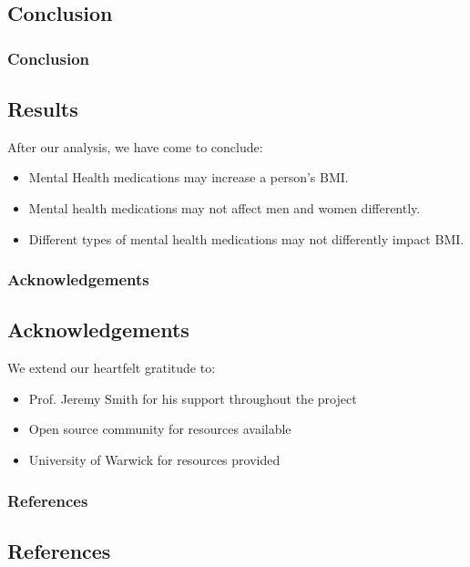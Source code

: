 \documentclass[
	11pt, %
]{beamer}
\begin{document}

\begin{frame} \section{Conclusion}
	\frametitle{Conclusion}\subsection{Results} %
 After our analysis, we have come to conclude:	
    \begin{itemize}
        \item Mental Health medications may increase a person's BMI.
        \item Mental health medications may not affect men and women differently.
        \item Different types of mental health medications may not differently impact BMI.
    \end{itemize}
\end{frame}


\begin{frame}
	\frametitle{Acknowledgements}\subsection{Acknowledgements} %
We extend our heartfelt gratitude to:
    \begin{itemize}
        \item Prof. Jeremy Smith for his support throughout the project
        \item Open source community for resources available
        \item University of Warwick for resources provided
    \end{itemize}

\end{frame}


\begin{frame} %
    \frametitle{References}\subsection{References}

\def\bibfont{\tiny}
 

		
\end{frame}

\end{document}
